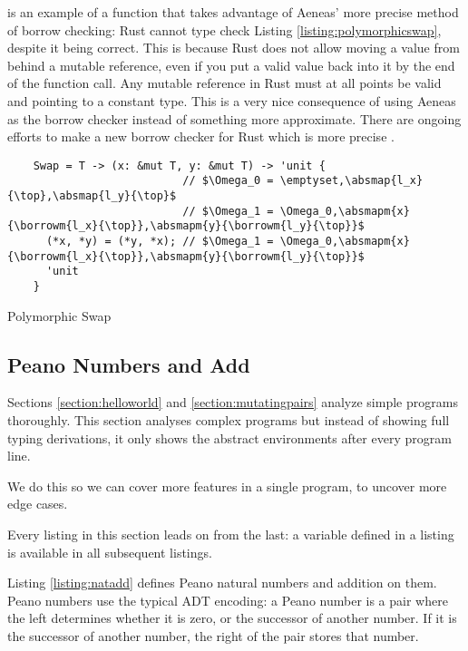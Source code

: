 \documentclass[12pt,twoside]{report}
\begin{document}
 is an example of a function that takes advantage of Aeneas' more precise method of borrow checking: Rust cannot type check Listing \ref{listing:polymorphicswap}, despite it being correct. This is because Rust does not allow moving a value from behind a mutable reference, even if you put a valid value back into it by the end of the function call. Any mutable reference in Rust must at all points be valid and pointing to a constant type. This is a very nice consequence of using Aeneas as the borrow checker instead of something more approximate. There are ongoing efforts to make a new borrow checker for Rust which is more precise \citep{PoloniusCurrentStatus}.

\begin{listing}
  \begin{verbatim}
    Swap = T -> (x: &mut T, y: &mut T) -> 'unit {
                           // $\Omega_0 = \emptyset,\absmap{l_x}{\top},\absmap{l_y}{\top}$
                           // $\Omega_1 = \Omega_0,\absmapm{x}{\borrowm{l_x}{\top}},\absmapm{y}{\borrowm{l_y}{\top}}$
      (*x, *y) = (*y, *x); // $\Omega_1 = \Omega_0,\absmapm{x}{\borrowm{l_x}{\top}},\absmapm{y}{\borrowm{l_y}{\top}}$
      'unit
    }
  \end{verbatim}
  \caption{Polymorphic Swap}
  \label{listing:polymorphicswap}
\end{listing}


\subsection{Peano Numbers and Add}
Sections \ref{section:helloworld} and \ref{section:mutatingpairs} analyze simple programs thoroughly. This section analyses complex programs but instead of showing full typing derivations, it only shows the abstract environments after every program line.

We do this so we can cover more features in a single program, to uncover more edge cases.

Every listing in this section leads on from the last: a variable defined in a listing is available in all subsequent listings.

Listing \ref{listing:natadd} defines Peano natural numbers and addition on them. Peano numbers use the typical ADT encoding: a Peano number is a pair where the left determines whether it is zero, or the successor of another number. If it is the successor of another number, the right of the pair stores that number.
\end{document}

